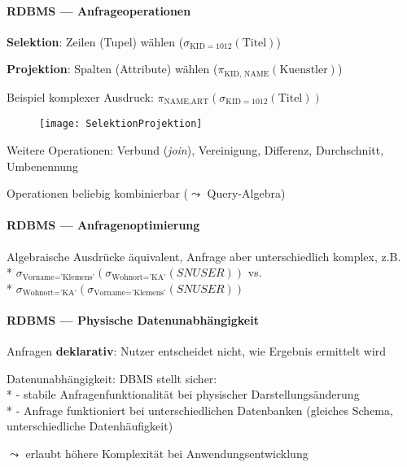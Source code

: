 \paragraph{RDBMS --- Anfrageoperationen}
\begin{items}
  \item \textbf{Selektion}: Zeilen (Tupel) wählen (\( \sigma_{\text{KID}=1012}(\text{Titel}) \))
  \item \textbf{Projektion}: Spalten (Attribute) wählen (\( \pi_{\text{KID, NAME}}(\text{Kuenstler}) \))
  \item Beispiel komplexer Ausdruck: \( \pi_{\text{NAME}, \text{ART}}(\sigma_{\text{KID}=1012}(\text{Titel})) \)
  \begin{figure}[H]\centering\label{SelektionProjektion}\texttt{[image: SelektionProjektion]}\end{figure}
  \item Weitere Operationen: Verbund (\emph{join}), Vereinigung, Differenz, Durchschnitt, Umbenennung
  \item Operationen beliebig kombinierbar (\( \leadsto \) Query-Algebra)
\end{items}

\paragraph{RDBMS --- Anfragenoptimierung}
\begin{items}
  \item Algebraische Ausdrücke äquivalent, Anfrage aber unterschiedlich komplex, z.B. \\* \( \sigma_{\text{Vorname} = \text{'Klemens'}}(\sigma_{\text{Wohnort} = \text{'KA'}}(SNUSER)) \) vs. \\* \( \sigma_{\text{Wohnort} = \text{'KA'}}(\sigma_{\text{Vorname} = \text{'Klemens'}}(SNUSER)) \)
\end{items}

\paragraph{RDBMS --- Physische Datenunabhängigkeit}
\begin{items}
  \item Anfragen \textbf{deklarativ}: Nutzer entscheidet nicht, wie Ergebnis ermittelt wird
  \item Datenunabhängigkeit: DBMS stellt sicher: \\*
    - stabile Anfragenfunktionalität bei physischer Darstellungsänderung \\*
    - Anfrage funktioniert bei unterschiedlichen Datenbanken (gleiches Schema, unterschiedliche Datenhäufigkeit)
  \item \( \leadsto \) erlaubt höhere Komplexität bei Anwendungsentwicklung
\end{items}

